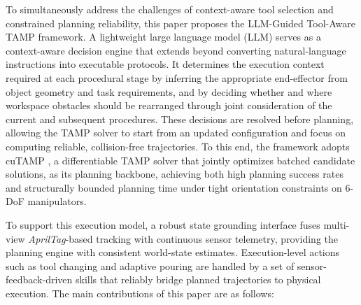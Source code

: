 \documentclass{ieeeaccess}
\begin{document}
To simultaneously address the challenges of context-aware tool selection and constrained planning reliability, this paper proposes the LLM-Guided Tool-Aware TAMP framework. A lightweight large language model (LLM) serves as a context-aware decision engine that extends beyond converting natural-language instructions into executable protocols. It determines the execution context required at each procedural stage by inferring the appropriate end-effector from object geometry and task requirements, and by deciding whether and where workspace obstacles should be rearranged through joint consideration of the current and subsequent procedures. These decisions are resolved before planning, allowing the TAMP solver to start from an updated configuration and focus on computing reliable, collision-free trajectories. To this end, the framework adopts cuTAMP \cite{shen2025differentiable}, a differentiable TAMP solver that jointly optimizes batched candidate solutions, as its planning backbone, achieving both high planning success rates and structurally bounded planning time under tight orientation constraints on 6-DoF manipulators.

To support this execution model, a robust state grounding interface fuses multi-view \textit{AprilTag}-based tracking with continuous sensor telemetry, providing the planning engine with consistent world-state estimates. Execution-level actions such as tool changing and adaptive pouring are handled by a set of sensor-feedback-driven skills that reliably bridge planned trajectories to physical execution. The main contributions of this paper are as follows:
\end{document}
